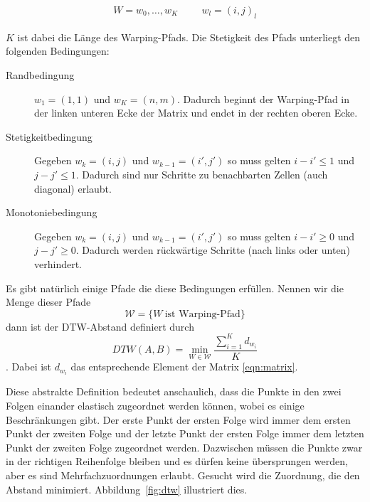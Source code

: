 \begin{align}
  W = w_0,\dots,w_K \hspace{1cm} w_l = (i,j)_l
\end{align}

$K$ ist dabei die Länge des Warping-Pfads. Die Stetigkeit des Pfads unterliegt den folgenden Bedingungen:

\begin{description}
  \item[Randbedingung] \( w_1 = (1,1) \) und \( w_K = (n,m) \). Dadurch beginnt der Warping-Pfad in der linken unteren Ecke der Matrix und endet in der rechten oberen Ecke.
  \item[Stetigkeitbedingung] Gegeben \( w_k = (i,j) \) und \( w_{k-1} = (i',j') \) so muss gelten \( i-i' \leqslant 1 \) und \( j-j' \leqslant 1 \). Dadurch sind nur Schritte zu benachbarten Zellen (auch diagonal) erlaubt.
  \item[Monotoniebedingung] Gegeben \( w_k = (i,j) \) und \( w_{k-1} = (i',j') \) so muss gelten \( i-i' \geqslant 0 \) und \( j-j' \geqslant 0 \). Dadurch werden rückwärtige Schritte (nach links oder unten) verhindert.
\end{description}

Es gibt natürlich einige Pfade die diese Bedingungen erfüllen. Nennen wir die Menge dieser Pfade
\[ \mathcal{W}=\{W~\text{ist Warping-Pfad}\} \]
dann ist der DTW-Abstand definiert durch
\begin{equation}
  \label{eqn:dtw}
  DTW(A,B) = \min_{W \in \mathcal{W}}{\frac{\sum_{i=1}^K d_{w_i}}{K}}
\end{equation}
. Dabei ist \( d_{w_i} \) das entsprechende Element der Matrix \ref{eqn:matrix}.

Diese abstrakte Definition bedeutet anschaulich, dass die Punkte in den zwei Folgen einander elastisch zugeordnet werden können, wobei es einige Beschränkungen gibt. Der erste Punkt der ersten Folge wird immer dem ersten Punkt der zweiten Folge und der letzte Punkt der ersten Folge immer dem letzten Punkt der zweiten Folge zugeordnet werden. Dazwischen müssen die Punkte zwar in der richtigen Reihenfolge bleiben und es dürfen keine übersprungen werden, aber es sind Mehrfachzuordnungen erlaubt. Gesucht wird die Zuordnung, die den Abstand minimiert. Abbildung~\ref{fig:dtw} illustriert dies.

